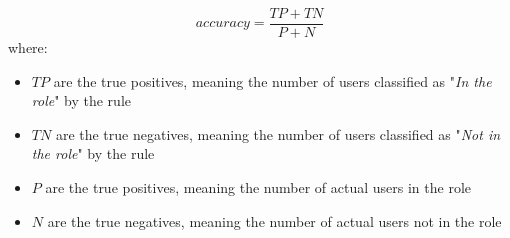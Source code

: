         \begin{equation}
            accuracy = \frac{TP+TN}{P+N}
        \end{equation}
        where:
        \begin{itemize}
            \item $TP$ are the true positives, meaning the number of users classified as "\textit{In the role}" by the rule
            \item $TN$ are the true negatives, meaning the number of users classified as "\textit{Not in the role}" by the rule
            \item $P$ are the true positives, meaning the number of actual users in the role
            \item $N$ are the true negatives, meaning the number of actual users not in the role
        \end{itemize}
